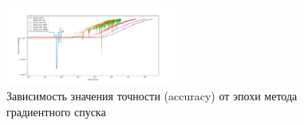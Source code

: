 \documentclass[a4paper, 11pt]{article}
\begin{document}
\begin{figure}[H]
\begin{multicols}{2}
\begin{center}
                        \caption{Зависимость значения точности (accuracy) от эпохи метода градиентного спуска} \label{exp3:sgd_acc_iter}
                        \includegraphics[width=0.5\textwidth, height=0.25\textheight]{../graphs/exp3_accuracy_SGD_bs_epoch_num_alpha=1_beta=0,01.pdf}
                    \end{center}
                \end{multicols}
            \end{figure}
            
\end{document}
